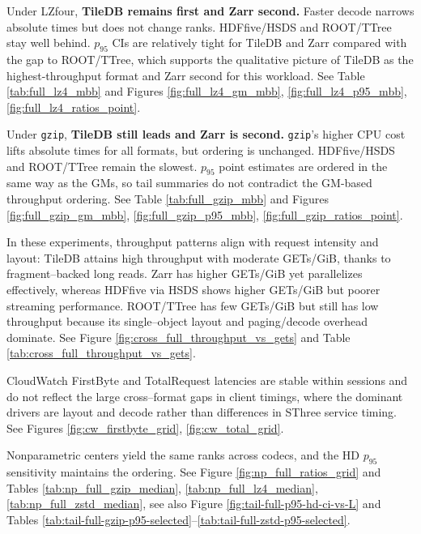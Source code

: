 \documentclass[nomenclature, english, bibtex]{kththesis}
\numberwithin{listing}{chapter}
\begin{document}
Under \gls{LZfour}, \textbf{TileDB remains first and Zarr second.} Faster decode narrows absolute times but does not change ranks. \Gls{HDFfive}/\gls{HSDS} and \gls{ROOT}/\gls{TTree} stay well behind. $p_{95}$ CIs are relatively tight for TileDB and Zarr compared with the gap to \gls{ROOT}/\gls{TTree}, which supports the qualitative picture of TileDB as the highest-throughput format and Zarr second for this workload. See Table \ref{tab:full_lz4_mbb} and Figures \ref{fig:full_lz4_gm_mbb}, \ref{fig:full_lz4_p95_mbb}, \ref{fig:full_lz4_ratios_point}.

Under \texttt{gzip}, \textbf{TileDB still leads and Zarr is second.} \texttt{gzip}’s higher \gls{CPU} cost lifts absolute times for all formats, but ordering is unchanged. \Gls{HDFfive}/\gls{HSDS} and \gls{ROOT}/\gls{TTree} remain the slowest. $p_{95}$ point estimates are ordered in the same way as the GMs, so tail summaries do not contradict the \gls{GM}-based throughput ordering. See Table \ref{tab:full_gzip_mbb} and Figures \ref{fig:full_gzip_gm_mbb}, \ref{fig:full_gzip_p95_mbb}, \ref{fig:full_gzip_ratios_point}.

In these experiments, throughput patterns align with request intensity and layout: TileDB attains high throughput with moderate GETs/GiB, thanks to fragment–backed long reads. Zarr has higher GETs/GiB yet parallelizes effectively, whereas \gls{HDFfive} via \gls{HSDS} shows higher GETs/GiB but poorer streaming performance. \gls{ROOT}/\gls{TTree} has few GETs/GiB but still has low throughput because its single–object layout and paging/decode overhead dominate. See Figure \ref{fig:cross_full_throughput_vs_gets} and Table \ref{tab:cross_full_throughput_vs_gets}.

CloudWatch FirstByte and TotalRequest latencies are stable within sessions and do not reflect the large cross–format gaps in client timings, where the dominant drivers are layout and decode rather than differences in \gls{SThree} service timing. See Figures \ref{fig:cw_firstbyte_grid}, \ref{fig:cw_total_grid}.

Nonparametric centers yield the same ranks across codecs, and the \gls{HD} $p_{95}$ sensitivity maintains the ordering. See Figure \ref{fig:np_full_ratios_grid} and Tables \ref{tab:np_full_gzip_median}, \ref{tab:np_full_lz4_median}, \ref{tab:np_full_zstd_median}, see also Figure \ref{fig:tail-full-p95-hd-ci-vs-L} and Tables \ref{tab:tail-full-gzip-p95-selected}–\ref{tab:tail-full-zstd-p95-selected}.
\end{document}
